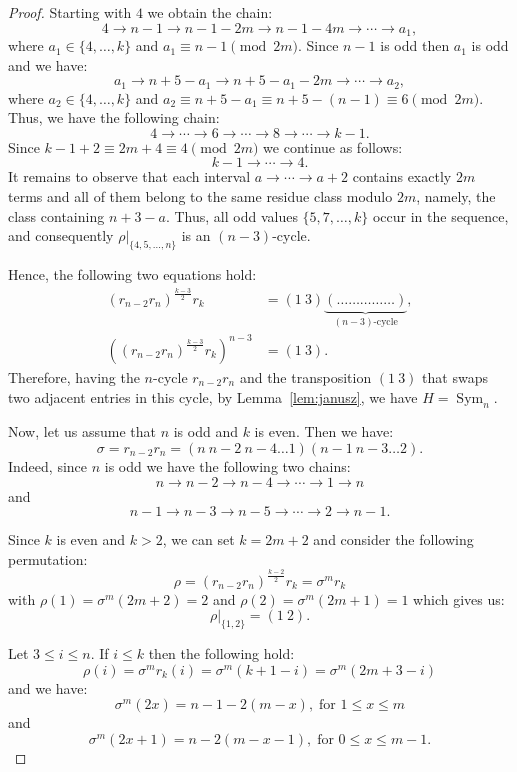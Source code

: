 \documentclass[
final
]{dmtcs-episciences}
\DeclareMathOperator{\Sym}{\mathrm{Sym}}
\begin{document}
\begin{proof}
Starting with \(4\) we obtain the chain:
\[
4 \rightarrow n-1 \rightarrow n-1-2m \rightarrow n-1-4m \rightarrow\cdots\rightarrow a_1, 
\]
where $a_1 \in \{4, \dots, k\}$ and $a_1 \equiv n-1 \pmod{2m}$. Since $n-1$ is odd then $a_1$ is odd and we have: 
\[
a_1 \rightarrow n + 5-a_1 \rightarrow n + 5-a_1 - 2m \rightarrow\cdots\rightarrow a_2,
\]
where $a_2 \in \{4, \dots, k\}$ and  $a_2 \equiv n + 5-a_1 \equiv  n + 5 -(n-1) \equiv 6 \pmod{2m}$. Thus, we have the following chain:
\[
4 \rightarrow \cdots \rightarrow 6 \rightarrow \cdots \rightarrow 8 \rightarrow \cdots \rightarrow k-1.
\]
Since $k-1 + 2 \equiv 2m+4 \equiv 4 \pmod{2m}$ we continue as follows: 
\[
k-1 \rightarrow \cdots \rightarrow 4.
\]
It remains to observe that each interval $a \rightarrow \cdots \rightarrow a+2$ contains exactly $2m$ terms and all of them belong to the same residue class modulo $2m$, namely, the class containing $n+3-a$. Thus, all odd values $\{5,7,\dots,k\}$ occur in the sequence, and consequently $\rho|_{\{4,5,\dots,n\}}$
is an $(n-3)$-cycle.

Hence, the following two equations hold: 
\begin{align*} (r_{n-2}r_n)^{\frac{k-3}{2}}r_k &= (1\ 3) \underbrace{(\dots \ldots \ldots \ldots \ldots)}_{\text{$(n-3)$-cycle}}, \\
((r_{n-2}r_n)^{\frac{k-3}{2}}r_k)^{n-3}&= (1\ 3). 
\end{align*}
Therefore, having the $n$-cycle $r_{n-2}r_n$ and the transposition $(1\ 3)$ that swaps two adjacent entries in this cycle, by Lemma~\ref{lem:janusz}, we have $H=\Sym_n$.

Now, let us assume that $n$ is odd and $k$ is even. Then we have: 
$$\sigma=r_{n-2} r_n=(n\ n-2\ n-4\dots 1)(n-1\ n-3 \dots 2).$$ 
Indeed, since $n$ is odd we have the following two chains:
\[
n \rightarrow n-2 \rightarrow n-4 \rightarrow\cdots\rightarrow 1 \rightarrow n
\]
and 
\[
n-1 \rightarrow n-3 \rightarrow n-5 \rightarrow\cdots\rightarrow 2 \rightarrow n-1.
\]

Since $k$ is even and $k > 2$, we can set $k=2m+2$ and consider the following permutation:
\[
\rho  = (r_{n-2}r_n)^{\frac{k-2}{2}}r_k = \sigma^{m}r_k
\]
with $\rho(1) = \sigma^{m}(2m+2) = 2$ and $\rho(2) = \sigma^{m}(2m+1) = 1$ which gives us: $$\rho\vert_{\{1,2\}} = (1\ 2).$$

Let $3 \leqslant i \leqslant n$. If $i \leqslant k$ then the following hold: 
\[
\rho(i) = \sigma^{m}r_k(i) = \sigma^{m}(k+1-i) = \sigma^{m}(2m+3-i) 
\]
and we have: 
\[
\sigma^{m}(2x) = n-1-2(m-x), \; \text{for } 1 \leqslant x \leqslant m
\]
and
\[
\sigma^{m}(2x+1) = n-2(m-x-1), \; \text{for } 0 \leqslant x \leqslant m-1.
\]


\end{proof}
\end{document}
